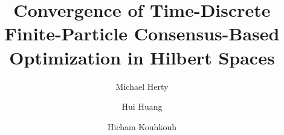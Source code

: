 \documentclass[12pt]{amsart}
\numberwithin{equation}{section}
\begin{document}
\title[Discrete Consensus-Based Optimization in Hilbert Spaces]
{Convergence of Time-Discrete Finite-Particle Consensus-Based Optimization in Hilbert Spaces}




\author{Michael Herty}
\address{Michael Herty \newline
Institut f\"ur Geometrie und Praktische Mathematik, RWTH Aachen University,  \newline
52062, Aachen, Germany. \newline
Extraordinary Professor, Department of Mathematics and Applied Mathematics, University of Pretoria, %
0028, South Africa}



\author{Hui Huang}
\address{Hui Huang \newline
School of Mathematics, 
Hunan University, , Changsha, China
}



\author{Hicham Kouhkouh}
\address{Hicham Kouhkouh \newline %
Department of Mathematics and Scientific Computing, NAWI, University of Graz,\newline %
8010, Graz, Austria
}










\end{document}
